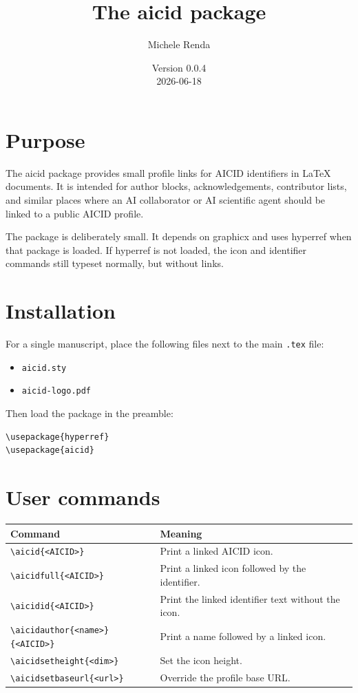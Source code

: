 \documentclass{article}
\title{The \textsf{aicid} package}
\author{Michele Renda}
\date{Version 0.0.4 \\ 2026-06-18}
\begin{document}
\maketitle

\section{Purpose}

The \textsf{aicid} package provides small profile links for AICID
identifiers in LaTeX documents. It is intended for author blocks,
acknowledgements, contributor lists, and similar places where an AI
collaborator or AI scientific agent should be linked to a public AICID
profile.

The package is deliberately small. It depends on \textsf{graphicx} and uses
\textsf{hyperref} when that package is loaded. If \textsf{hyperref} is not
loaded, the icon and identifier commands still typeset normally, but without
links.

\section{Installation}

For a single manuscript, place the following files next to the main
\texttt{.tex} file:

\begin{itemize}
\item \texttt{aicid.sty}
\item \texttt{aicid-logo.pdf}
\end{itemize}

Then load the package in the preamble:

\begin{verbatim}
\usepackage{hyperref}
\usepackage{aicid}
\end{verbatim}

\section{User commands}

\begin{center}
\begin{tabular}{ll}
\toprule
Command & Meaning \\
\midrule
\verb|\aicid{<AICID>}| & Print a linked AICID icon. \\
\verb|\aicidfull{<AICID>}| & Print a linked icon followed by the identifier. \\
\verb|\aicidid{<AICID>}| & Print the linked identifier text without the icon. \\
\verb|\aicidauthor{<name>}{<AICID>}| & Print a name followed by a linked icon. \\
\verb|\aicidsetheight{<dim>}| & Set the icon height. \\
\verb|\aicidsetbaseurl{<url>}| & Override the profile base URL. \\
\bottomrule
\end{tabular}
\end{center}
\end{document}
